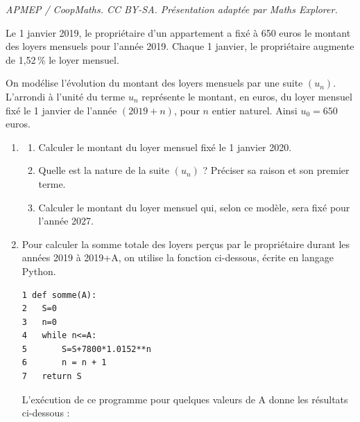 \documentclass[10pt]{article}
\begin{document}
\noindent\textit{APMEP / CoopMaths. CC BY-SA. Présentation adaptée par Maths Explorer.}\par\medskip
\medskip

Le 1 janvier 2019, le propriétaire d'un appartement a fixé à 650 euros le montant des loyers mensuels pour l'année 2019. Chaque 1 janvier, le propriétaire augmente de 1,52\,\% le loyer mensuel.

On modélise l'évolution du montant des loyers mensuels par une suite $\left(u_n\right)$. L'arrondi à l'unité du terme $u_n$ représente le montant, en euros, du loyer mensuel fixé le 1 janvier de l'année $(2019+n)$, pour $n$ entier naturel. Ainsi $u_0 = 650$ euros.

\medskip

\begin{enumerate}
\item 
	\begin{enumerate}
		\item Calculer le montant du loyer mensuel fixé le 1 janvier 2020.
		\item Quelle est la nature de la suite $\left(u_n\right)$ ? Préciser sa raison et son premier terme.
		\item Calculer le montant du loyer mensuel qui, selon ce modèle, sera fixé pour l'année 2027.
	\end{enumerate}
\item Pour calculer la somme totale des loyers perçus par le propriétaire durant les années 2019
à 2019+A, on utilise la fonction ci-dessous, écrite en langage Python.

\begin{lstlisting}[style=python]
1 def somme(A):
2 	S=0
3 	n=0
4 	while n<=A:
5		S=S+7800*1.0152**n
6 		n = n + 1
7 	return S
\end{lstlisting}

L'exécution de ce programme pour quelques valeurs de A donne les résultats ci-dessous :

\begin{center}


\end{center}
\end{enumerate}
\end{document}

